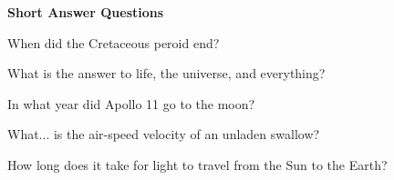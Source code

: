 \documentclass[10pt,addpoints]{exam}
\begin{document}
\begin{questions}



\newpage
\begin{center}
{\Large \textbf{Short Answer Questions}}
\end{center}

\par\vspace{0.100000in}\begin{minipage}{\linewidth}
\vspace{.35cm}\question[2]
When did the Cretaceous peroid end?
\vspace{.25cm}\setlength\answerlinelength{3in}
\end{minipage}


\par\vspace{0.100000in}\begin{minipage}{\linewidth}
\vspace{.35cm}\question[2]
What is the answer to life, the universe, and everything?
\vspace{.25cm}\setlength\answerlinelength{3in}
\answerline[42]
\end{minipage}


\par\vspace{0.100000in}\begin{minipage}{\linewidth}
\vspace{.35cm}\question[2]
In what year did Apollo 11 go to the moon?
\vspace{.25cm}\setlength\answerlinelength{3in}
\answerline[1969]
\end{minipage}


\par\vspace{0.100000in}\begin{minipage}{\linewidth}
\vspace{.35cm}\question[2]
What... is the air-speed velocity of an unladen swallow?
\vspace{.25cm}\setlength\answerlinelength{3in}
\end{minipage}


\par\vspace{0.100000in}\begin{minipage}{\linewidth}
\vspace{.35cm}\question[2]
How long does it take for light to travel from the Sun to the Earth?
\vspace{.25cm}\setlength\answerlinelength{3in}
\answerline[8 minutes]
\end{minipage}



\end{questions}
\end{document}
